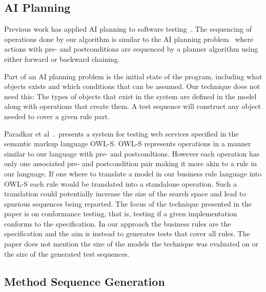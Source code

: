 \subsection{AI Planning}

Previous work has applied AI planning to software
testing~\cite{Scheetz99ai,Howe97testcase}. The sequencing of
operations done by our algorithm is similar to the AI planning
problem~\cite{Weld94} where actions with pre- and postconditions are
sequenced by a planner algorithm using either forward or backward
chaining. 

Part of an AI planning problem is the initial state of the program,
including what objects exists and which conditions that can be
assumed. Our technique does not need this: The types of objects that
exist in the system are defined in the model along with operations
that create them. A test sequence will construct any object needed to
cover a given rule part.

Paradkar et al~\cite{conf/icws/ParadkarSWJOSL07}.\ presents a system
for testing web services specified in the semantic markup language
OWL-S. OWL-S represents operations in a manner similar to our language
with pre- and postcondtions. However each operation has only one
associated pre- and postcondition pair making it more akin to a rule
in our language. If one where to translate a model in our business
rule language into OWL-S each rule would be translated into a standalone
operation. Such a translation could potentially increase the size of
the search space and lead to spurious sequences being reported. The
focus of the technique presented in the paper is on conformance
testing, that is, testing if a given implementation conforms to the
specification. In our approach the business rules are the
specification and the aim is instead to generates tests that cover all
rules. The paper does not mention the size of the models the technique
was evaluated on or the size of the generated test sequences.

\subsection{Method Sequence Generation}



